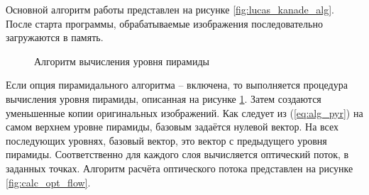 Основной алгоритм работы представлен на рисунке \ref{fig:lucas_kanade_alg}. После старта программы, обрабатываемые изображения последовательно загружаются в память.
\begin{figure}[h!]
\caption{Алгоритм вычисления уровня пирамиды}
\label{fig:calc_pyr}
\end{figure}
Если опция пирамидального алгоритма -- включена, то выполняется процедура вычисления уровня пирамиды, описанная на рисунке \ref{fig:calc_pyr}. Затем создаются уменьшенные копии оригинальных изображений.
Как следует из (\ref{eq:alg_pyr}) на самом верхнем уровне пирамиды, базовым задаётся нулевой вектор. На всех последующих уровнях, базовый вектор, это вектор с предыдущего уровня пирамиды.
Соответственно для каждого слоя вычисляется оптический поток, в заданных точках. Алгоритм расчёта оптического потока представлен на рисунке \ref{fig:calc_opt_flow}. 

